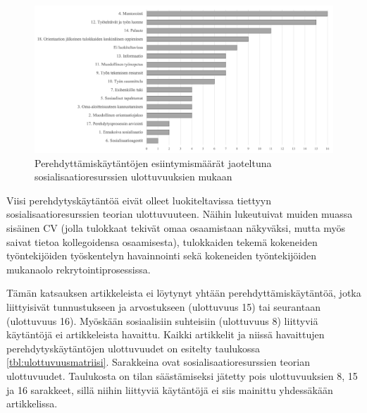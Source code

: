 \documentclass[utf8]{gradu3}
\begin{document}
\begin{figure}[h]
    \centering
    \includegraphics[width=\textwidth]{media/ulottuvuudet.png}
    \caption{Perehdyttämiskäytäntöjen esiintymismäärät jaoteltuna sosialisaatioresurssien \parencite{saks-gruman-2012} ulottuvuuksien mukaan}
    \label{kuvio:ulottuvuudet}
\end{figure}

Viisi perehdytyskäytäntöä eivät olleet luokiteltavissa tiettyyn sosialisaatioresurssien teorian ulottuvuuteen. Näihin lukeutuivat muiden muassa sisäinen CV (jolla tulokkaat tekivät omaa osaamistaan näkyväksi, mutta myös saivat tietoa kollegoidensa osaamisesta), tulokkaiden tekemä kokeneiden työntekijöiden työskentelyn havainnointi sekä kokeneiden työntekijöiden mukanaolo rekrytointiprosessissa. 

Tämän katsauksen artikkeleista ei löytynyt yhtään perehdyttämiskäytäntöä, jotka liittyisivät tunnustukseen ja arvostukseen (ulottuvuus 15) tai seurantaan (ulottuvuus 16). Myöskään sosiaalisiin suhteisiin (ulottuvuus 8) liittyviä käytäntöjä ei artikkeleista havaittu. Kaikki artikkelit ja niissä havaittujen perehdytyskäytäntöjen ulottuvuudet on esitelty taulukossa \ref{tbl:ulottuvuusmatriisi}. Sarakkeina ovat sosialisaatioresurssien teorian ulottuvuudet. Taulukosta on tilan säästämiseksi jätetty pois ulottuvuuksien 8, 15 ja 16 sarakkeet, sillä niihin liittyviä käytäntöjä ei siis mainittu yhdessäkään artikkelissa.
\end{document}
